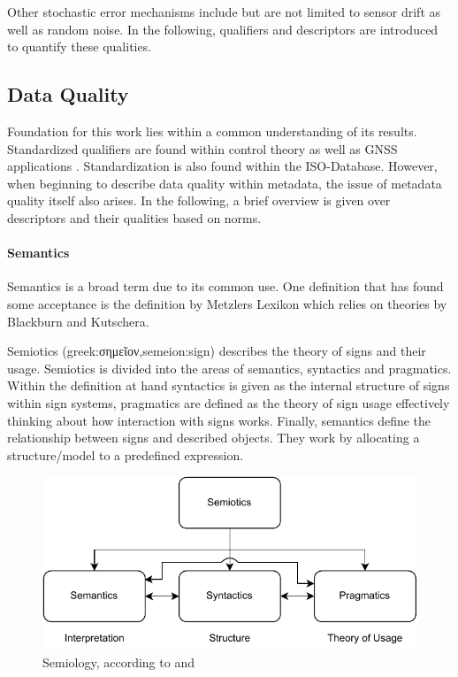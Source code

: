 Other stochastic error mechanisms include but are not limited to sensor drift as well as random noise. In the following, qualifiers and descriptors are introduced to quantify these qualities.

\subsection{Data Quality}

Foundation for this work lies within a common understanding of its results. Standardized qualifiers are found within control theory \cite{isermann_fault-diagnosis_2011} as well as GNSS applications \cite{teunissen_springer_2017}. Standardization is also found within the ISO-Database. However, when beginning to describe data quality within metadata, the issue of metadata quality itself also arises. In the following, a brief overview is given over descriptors and their qualities based on norms.

\paragraph{Semantics}
Semantics is a broad term due to its common use. One definition that has found some acceptance is the definition by Metzlers Lexikon which relies on theories by Blackburn and Kutschera. \cite{shoemaker_spreading_1987,kutschera_sprachphilosophie_1975}


Semiotics (greek:\textgreek{σημεῖον},semeion:sign) describes the theory of signs and their usage. Semiotics is divided into the areas of semantics, syntactics and pragmatics. Within the definition at hand syntactics is given as the internal structure of signs within sign systems, pragmatics are defined as the theory of sign usage effectively thinking about how interaction with signs works. Finally, semantics define the relationship between signs and described objects. They work by allocating a structure/model to a predefined expression.

\begin{figure}
    \centering
    \includegraphics[width=.7\textwidth]{03_figures/semiotics.pdf}
    \caption{Semiology, according to \textcite{kutschera_sprachphilosophie_1975} and \textcite{shoemaker_spreading_1987}}
\end{figure}

